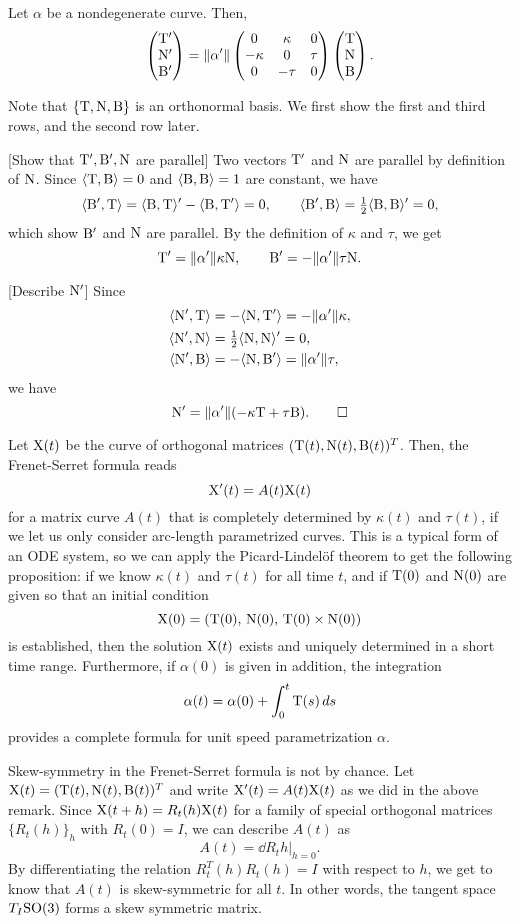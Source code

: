 \documentclass{../exp}
\def\a{\alpha}
\begin{document}
\begin{thm}
Let $\a$ be a nondegenerate curve.
Then,
\[\mat{\rT'\\\rN'\\\rB'}=\|\a'\|\mat{0&\kappa&0\\-\kappa&0&\tau\\0&-\tau&0}\mat{\rT\\\rN\\\rB}.\]
\end{thm}
\begin{pf}
Note that $\{\mathrm{T},\mathrm{N},\mathrm{B}\}$ is an orthonormal basis.
We first show the first and third rows, and the second row later.

[Show that $\mathrm{T}',\mathrm{B}',\mathrm{N}$ are parallel]
Two vectors $\mathrm{T}'$ and $\mathrm{N}$ are parallel by definition of $\mathrm{N}$.
Since $\langle\mathrm{T},\mathrm{B}\rangle=0$ and $\langle\mathrm{B},\mathrm{B}\rangle=1$ are constant, we have
\[\langle\mathrm{B}',\mathrm{T}\rangle=\langle\mathrm{B},\mathrm{T}\rangle'-\langle\mathrm{B},\mathrm{T}'\rangle=0,\qquad\langle\mathrm{B}',\mathrm{B}\rangle=\tfrac12\langle\mathrm{B},\mathrm{B}\rangle'=0,\]
which show $\mathrm{B}'$ and $\mathrm{N}$ are parallel.
By the definition of $\kappa$ and $\tau$, we get
\[\rT'=\|\a'\|\kappa\rN,\qquad\rB'=-\|\a'\|\tau\rN.\]

[Describe $\mathrm{N}'$]
Since
\begin{align*}
\<\rN',\rT\>&=-\<\rN,\rT'\>=-\|\a'\|\kappa,\\
\<\rN',\rN\>&=\tfrac12\<\rN,\rN\>'=0,\\
\<\rN',\rB\>&=-\<\rN,\rB'\>=\|\a'\|\tau,
\end{align*}
we have
\[\rN'=\|\a'\|(-\kappa\rT+\tau\rB).\qedhere\]
\end{pf}
\begin{rmk}
Let $\mathrm{X}(t)$ be the curve of orthogonal matrices $(\mathrm{T}(t),\mathrm{N}(t),\mathrm{B}(t))^T$.
Then, the Frenet-Serret formula reads
\[\mathrm{X}'(t)=A(t)\mathrm{X}(t)\]
for a matrix curve $A(t)$ that is completely determined by $\kappa(t)$ and $\tau(t)$, if we let us only consider arc-length parametrized curves.
This is a typical form of an ODE system, so we can apply the Picard-Lindel\"of theorem to get the following proposition: if we know $\kappa(t)$ and $\tau(t)$ for all time $t$, and if $\mathrm{T}(0)$ and $\mathrm{N}(0)$ are given so that an initial condition
\[\mathrm{X}(0)=(\mathrm{T}(0),\,\mathrm{N}(0),\,\mathrm{T}(0)\times\mathrm{N}(0))\]
is established, then the solution $\mathrm{X}(t)$ exists and uniquely determined in a short time range.
Furthermore, if $\a(0)$ is given in addition, the integration
\[\a(t)=\a(0)+\int_0^t\rT(s)\,ds\]
provides a complete formula for unit speed parametrization $\a$.
\end{rmk}
\begin{rmk}
Skew-symmetry in the Frenet-Serret formula is not by chance.
Let $\mathrm{X}(t)=(\mathrm{T}(t),\mathrm{N}(t),\mathrm{B}(t))^T$ and write $\mathrm{X}'(t)=A(t)\mathrm{X}(t)$ as we did in the above remark.
Since $\mathrm{X}(t+h)=R_t(h)\mathrm{X}(t)$ for a family of special orthogonal matrices $\{R_t(h)\}_h$ with $R_t(0)=I$, we can describe $A(t)$ as 
\[A(t)=\left.\dd{R_t}{h}\right\rvert_{h=0}.\]
By differentiating the relation $R_t^T(h)R_t(h)=I$ with respect to $h$, we get to know that $A(t)$ is skew-symmetric for all $t$.
In other words, the tangent space $T_I\mathrm{SO}(3)$ forms a skew symmetric matrix.
\end{rmk}
\end{document}
